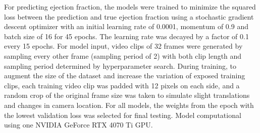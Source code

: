 For predicting ejection fraction, the models were trained to minimize the squared loss between the prediction and true ejection fraction using a stochastic gradient descent optimizer with an initial learning rate of 0.0001, momentum of 0.9 and batch size of 16 for 45 epochs. The learning rate was decayed by a factor of 0.1 every 15 epochs. For model input, video clips of 32 frames were generated by sampling every other frame (sampling period of 2) with both clip length and sampling period determined by hyperparameter search. During training, to augment the size of the dataset and increase the variation of exposed training clips, each training video clip was padded with 12 pixels on each side, and a random crop of the original frame size was taken to simulate slight translations and changes in camera location. For all models, the weights from the epoch with the lowest validation loss was selected for final testing. Model computational using one NVIDIA GeForce RTX 4070 Ti GPU.


